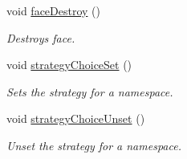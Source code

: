 \begin{DoxyCompactItemize}
void \hyperlink{classnfdc_1_1Nfdc_a9ff70019cf602a7c1ef511784b7b520e}{face\+Destroy} ()
\begin{DoxyCompactList}\small\item\em Destroys face. \end{DoxyCompactList}\item 
void \hyperlink{classnfdc_1_1Nfdc_ab1a957c98a28ac8c4631f1971abc3b88}{strategy\+Choice\+Set} ()
\begin{DoxyCompactList}\small\item\em Sets the strategy for a namespace. \end{DoxyCompactList}\item 
void \hyperlink{classnfdc_1_1Nfdc_aa62591be3bb9d3e6e4c8be6d0b79eefe}{strategy\+Choice\+Unset} ()
\begin{DoxyCompactList}\small\item\em Unset the strategy for a namespace. \end{DoxyCompactList}\end{DoxyCompactItemize}
